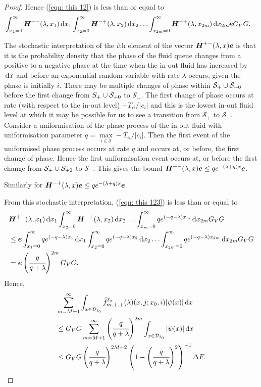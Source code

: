 \begin{proof}
	Hence (\ref{eqn: this 12}) is less than or equal to 
	\begin{align}
		& \int_{x_1=0}^\infty \boldsymbol H^{+-}(\lambda,x_1) \, \mathrm{d} x_1 \int_{x_2=0}^\infty \boldsymbol H^{-+}(\lambda,x_2)  \, \mathrm{d} x_2  
                	\hdots \int_{x_{2m}=0}^\infty \boldsymbol H^{-+}(\lambda, x_{2m})\, \mathrm{d} x_{2m}\boldsymbol e G_VG. \label{eqn: this 123}
        \end{align}
	        
        The stochastic interpretation of the \(i\)th element of the vector \(\boldsymbol H^{+-}(\lambda,x)\boldsymbol e\) is that it is the probability density that the phase of the fluid queue changes from a positive to a negative phase at the time when the in-out fluid has increased by \(\, \mathrm{d} x\) and before an exponential random variable with rate \(\lambda\) occurs, given the phase is initially \(i\). There may be multiple changes of phase within \(\mathcal S_+\cup\mathcal{S}_{+0}\) before the first change from \(\mathcal \mathcal S_+\cup\mathcal{S}_{+0}\) to \(\mathcal S_-\). The first change of phase occurs at rate (with respect to the in-out level) \(-T_{ii}/|c_i|\) and this is the lowest in-out fluid level at which it may be possible for us to see a transition from \(\mathcal S_+\) to \(\mathcal S_-\). Consider a uniformisation of the phase process of the in-out fluid with uniformisation parameter \(q = \max\limits_{i\in\mathcal S}-T_{ii}/|c_i|\). Then the first event of the uniformised phase process occurs at rate \(q\) and occurs at, or before, the first change of phase. Hence the first uniformisation event occurs at, or before the first change from \(\mathcal S_+\cup\mathcal{S}_{+0}\) to \(\mathcal S_-\). This gives the bound \(\boldsymbol H^{+-}(\lambda,x)\boldsymbol e\leq qe^{-(\lambda + q)x}\boldsymbol e\).
        
        Similarly for \(\boldsymbol H^{-+}(\lambda,x)\boldsymbol e\leq qe^{-(\lambda + q)x}\boldsymbol e\).
        
        From this stochastic interpretation, (\ref{eqn: this 123}) is less than or equal to 
        \begin{align}
		&\boldsymbol H^{+-}(\lambda,x_1) \, \mathrm{d} x_1 \int_{x_2=0}^\infty \boldsymbol H^{-+}(\lambda,x_2)  \, \mathrm{d} x_2  
                	\hdots \int_{x_m=0}^\infty qe^{(-q-\lambda)x_m}\, \mathrm{d} x_{2m}G_VG \nonumber
		\\&\leq \boldsymbol e\int_{x_1=0}^\infty qe^{(-q-\lambda)x_1}  \, \mathrm{d} x_1 \int_{x_2=0}^\infty qe^{(-q-\lambda)x_2}  \, \mathrm{d} x_2  
                	\hdots \int_{x_{2m}=0}^\infty qe^{(-q-\lambda)x_{2m}}\, \mathrm{d} x_{2m}G_VG \nonumber
		\\&= \boldsymbol e\left(\cfrac{q}{q+\lambda}\right)^{2m}G_VG.\label{eqn: bound ggggaaaa}
        \end{align}
        Hence,  
        \begin{align}
	         &\sum_{m=M+1}^\infty \int_{x\in\mathcal{D}_{\ell_0}} \widehat f^{\ell_0}_{m,+,+}(\lambda)(x,j;x_0,i)|\psi(x)|\, \mathrm{d} x \nonumber
	        \\&\leq  {G_V}G  \sum_{m=M+1}^\infty \left(\cfrac{q}{q+\lambda}\right)^{2m}\int_{x\in\mathcal{D}_{\ell_0}} |\psi(x)|\, \mathrm{d} x \nonumber
	        \\&\leq {G_V}G \left(\cfrac{q}{q+\lambda}\right)^{2M+2} \left(1-\left(\cfrac{q}{q+\lambda}\right)^2\right)^{-1} \Delta F.
        \end{align}
        

\end{proof}
